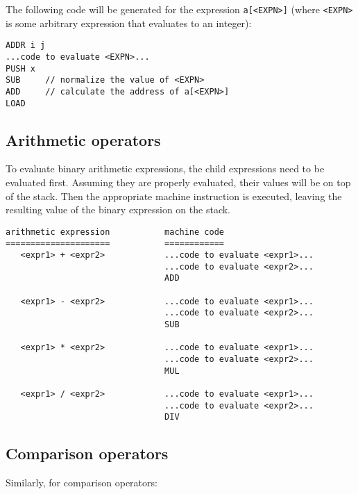 \documentclass[11pt]{article}
\begin{document}
The following code will be generated for the expression \texttt{a[<EXPN>]} (where \texttt{<EXPN>} is some arbitrary expression that evaluates to an integer):

\begin{verbatim}
ADDR i j
...code to evaluate <EXPN>...
PUSH x
SUB     // normalize the value of <EXPN>
ADD     // calculate the address of a[<EXPN>]
LOAD
\end{verbatim}

\subsection{Arithmetic operators}

To evaluate binary arithmetic expressions, the child expressions need to be evaluated first. Assuming they are properly evaluated, their values will be on top of the stack. Then the appropriate machine instruction is executed, leaving the resulting value of the binary expression on the stack.

\begin{verbatim}
arithmetic expression           machine code
=====================           ============
   <expr1> + <expr2>            ...code to evaluate <expr1>...
                                ...code to evaluate <expr2>...
                                ADD
                                
   <expr1> - <expr2>            ...code to evaluate <expr1>...
                                ...code to evaluate <expr2>...
                                SUB

   <expr1> * <expr2>            ...code to evaluate <expr1>...
                                ...code to evaluate <expr2>...
                                MUL

   <expr1> / <expr2>            ...code to evaluate <expr1>...
                                ...code to evaluate <expr2>...
                                DIV
\end{verbatim}

\subsection{Comparison operators}

Similarly, for comparison operators: 
\end{document}
